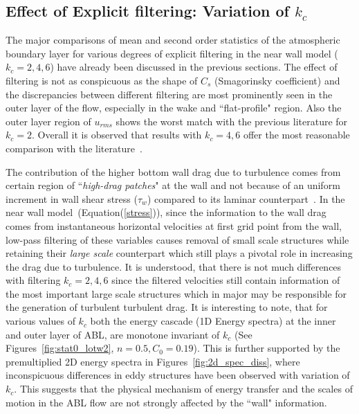 \subsection{Effect of Explicit filtering: Variation of $k_c$}
The major comparisons of mean and second order statistics of the atmospheric boundary layer for various degrees of explicit filtering in the near wall model ($k_c = 2, 4, 6$) {have} already {been} discussed in the previous sections. The effect of filtering is not as conspicuous as the shape of $C_s$ (Smagorinsky coefficient) and the discrepancies between different filtering are most prominently seen in the outer layer of the flow, especially in the wake and ``flat-profile" region. Also the outer layer region of $u_{rms}$ shows the worst match with the previous literature for $k_c = 2$. Overall it is observed that results with $k_c = 4, 6$ offer the most reasonable comparison with the literature~\cite{porte1fun}.

{The contribution of the higher bottom wall drag due to turbulence comes from certain region of ``\textit{high-drag patches}" at the wall and not because of an uniform increment in wall shear stress ($\tau_{w}$) compared to its laminar counterpart~\cite{kim1}.}  In the near wall model~(Equation(\ref{stress})), since the information to the wall drag comes from instantaneous horizontal velocities at first grid point from the wall, {low-pass filtering of these variables causes removal of small scale structures while retaining their \textit{large scale} counterpart which still plays a pivotal role in increasing the drag due to turbulence.}  {It is understood, that there is not much differences with filtering $k_c = 2, 4, 6$ since the filtered velocities still contain information of the most important large scale structures which in major may be responsible for the generation of turbulent turbulent drag.} 
It is interesting to note, that for various values of $k_c$ both the energy cascade (1D Energy spectra) at the inner and outer layer of ABL, are monotone invariant of $k_c$ (See Figures~\ref{fig:stat0_lotw2}, $n = 0.5, C_0 = 0.19$). This is further supported by the premultiplied 2D energy spectra in Figures~\ref{fig:2d_spec_diss}, where inconspicuous differences in eddy structures have been observed with variation of $k_c$. {This suggests that the physical mechanism of energy transfer and the scales of motion in the ABL flow are {not strongly affected} by the  ``wall" information.} 

